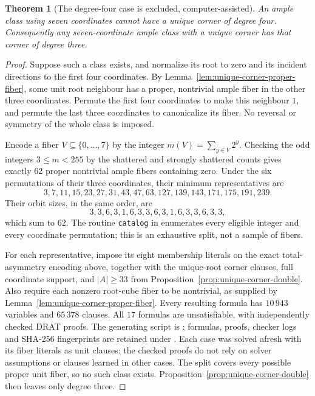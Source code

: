 \documentclass[11pt]{article}
\numberwithin{equation}{section}
\newtheorem{theorem}{Theorem}[section]
\theoremstyle{definition}
\theoremstyle{remark}
\begin{document}
\begin{theorem}[The degree-four case is excluded, computer-assisted]
\label{thm:unique-corner-degree-four}
An ample class using seven coordinates cannot have a unique corner of
degree four. Consequently any seven-coordinate ample class with a
unique corner has that corner of degree three.
\end{theorem}
\begin{proof}
Suppose such a class exists, and normalize its root to zero and its
incident directions to the first four coordinates. By
Lemma~\ref{lem:unique-corner-proper-fiber}, some unit root neighbour
has a proper, nontrivial ample fiber in the other three coordinates.
Permute the first four coordinates to make this neighbour $1$, and
permute the last three coordinates to canonicalize its fiber.
No reversal or symmetry of the whole class is imposed.

Encode a fiber $V\subseteq\{0,\ldots,7\}$ by the integer
$m(V)=\sum_{y\in V}2^y$. Checking the odd integers $3\le m<255$
by the shattered and strongly shattered counts gives exactly $62$
proper nontrivial ample fibers containing zero. Under the six
permutations of their three coordinates, their minimum representatives
are
\[
3,7,11,15,23,27,31,43,47,63,127,139,143,171,175,191,239.
\]
Their orbit sizes, in the same order, are
\[
3,3,6,3,1,6,3,3,6,3,1,6,3,3,6,3,3,
\]
which sum to $62$. The routine \texttt{catalog} in
 enumerates every eligible
integer and every coordinate permutation; this is an exhaustive split,
not a sample of fibers.

For each representative, impose its eight membership literals on the
exact total-asymmetry encoding above, together with the unique-root
corner clauses, full coordinate support, and $|A|\ge33$ from
Proposition~\ref{prop:unique-corner-double}. Also require each nonzero
root-cube fiber to be nontrivial, as supplied by
Lemma~\ref{lem:unique-corner-proper-fiber}. Every resulting formula has
$10\,943$ variables and $65\,378$ clauses. All $17$ formulas are
unsatisfiable, with independently checked DRAT proofs. The generating
script is ; formulas,
proofs, checker logs and SHA-256 fingerprints are retained under
.
Each case was solved afresh with its fiber literals as unit clauses:
the checked proofs do not rely on solver assumptions or clauses learned
in other cases. The split covers every possible proper unit fiber, so
no such class exists. Proposition~\ref{prop:unique-corner-double}
then leaves only degree three.
\end{proof}
\end{document}
